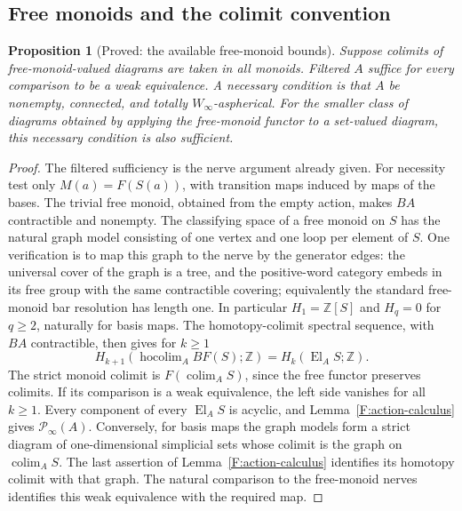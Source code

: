 \documentclass[11pt,a4paper]{article}
\newtheorem{proposition}[theorem]{Proposition}
\theoremstyle{definition}
\theoremstyle{remark}
\newcommand{\Winfty}{W_\infty}
\newcommand{\El}{\operatorname{El}}
\newcommand{\colim}{\operatorname*{colim}}
\begin{document}
\subsection{Free monoids and the colimit convention}

\begin{proposition}[Proved: the available free-monoid bounds]
\label{F:free-monoid-bounds}
Suppose colimits of free-monoid-valued diagrams are taken in all
monoids.  Filtered $A$ suffice for every comparison to be a weak
equivalence.  A necessary condition is that $A$ be nonempty,
connected, and totally $\Winfty$-aspherical.  For the smaller class
of diagrams obtained by applying the free-monoid functor to a
set-valued diagram, this necessary condition is also sufficient.
\end{proposition}
\begin{proof}
The filtered sufficiency is the nerve argument already given.
For necessity test only $M(a)=F(S(a))$, with transition maps induced
by maps of the bases.  The trivial free monoid, obtained from the
empty action, makes $BA$ contractible and nonempty.
The classifying space of a free monoid on $S$ has the natural
graph model consisting of one vertex and one loop per element of
$S$.  One verification is to map this graph to the nerve by the
generator edges: the universal cover of the graph is a tree, and
the positive-word category embeds in its free group with the same
contractible covering; equivalently the standard free-monoid bar
resolution has length one.  In particular $H_1=\mathbb Z[S]$ and
$H_q=0$ for $q\geq2$, naturally for basis maps.
The homotopy-colimit spectral sequence, with $BA$ contractible,
then gives for $k\geq1$
\[
 H_{k+1}(\operatorname{hocolim}_A BF(S);\mathbb Z)
   =H_k(\El_A S;\mathbb Z).
\]
The strict monoid colimit is $F(\colim_A S)$, since the free functor
preserves colimits.  If its comparison is a weak equivalence, the
left side vanishes for all $k\geq1$.  Every component of every
$\El_A S$ is acyclic, and Lemma~\ref{F:action-calculus} gives
$\mathcal P_\infty(A)$.
Conversely, for basis maps the graph models form a strict diagram
of one-dimensional simplicial sets whose colimit is the graph on
$\colim_A S$.  The last assertion of
Lemma~\ref{F:action-calculus} identifies its homotopy colimit with
that graph.  The natural comparison to the free-monoid nerves
identifies this weak equivalence with the required map.
\end{proof}
\end{document}
